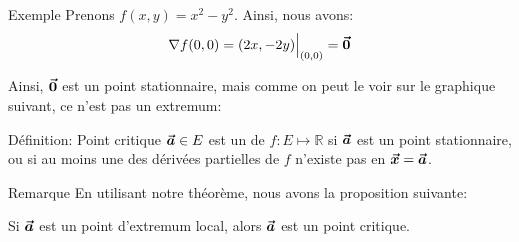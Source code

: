 \documentclass[a4paper]{article}
\begin{document}
\begin{parag}{Exemple}
    Prenons $f\left(x, y\right) = x^2 - y^2$. Ainsi, nous avons: 
    \[\nabla f\left(0, 0\right) = \left(2x, -2y\right)\eval_{\left(0,0\right)}^{} = \bvec{0}\]

    Ainsi, $\bm{\protect\vec{0}}$ est un point stationnaire, mais comme on peut le voir sur le graphique suivant, ce n'est pas un extremum:
\end{parag}

\begin{parag}{Définition: Point critique}
    $\bm{\protect\vec{a}} \in E$ est un  de $f: E \mapsto \mathbb{R}$ si $\bm{\protect\vec{a}}$ est un point stationnaire, ou si au moins une des dérivées partielles de $f$ n'existe pas en $\bm{\protect\vec{x}} = \bm{\protect\vec{a}}$.

    \begin{subparag}{Remarque}
        En utilisant notre théorème, nous avons la proposition suivante:

        Si $\bm{\protect\vec{a}}$ est un point d'extremum local, alors $\bm{\protect\vec{a}}$ est un point critique.
    \end{subparag}
\end{parag}
\end{document}
